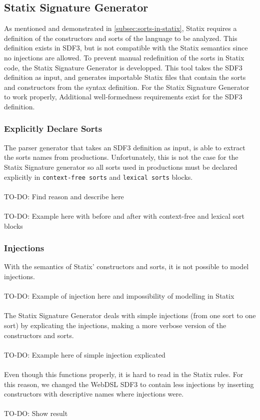     \subsection{\label{subsec:statix-signature-generator}Statix Signature Generator}

      As mentioned and demonstrated in \cref{subsec:sorts-in-statix}, Statix requires a definition of the constructors and sorts of the language to be analyzed. This definition exists in SDF3, but is not compatible with the Statix semantics since no injections are allowed. To prevent manual redefinition of the sorts in Statix code, the Statix Signature Generator is developped. This tool takes the SDF3 definition as input, and generates importable Statix files that contain the sorts and constructors from the syntax definition. For the Statix Signature Generator to work properly, Additional well-formedness requirements exist for the SDF3 definition.

      \subsubsection{Explicitly Declare Sorts}

        The parser generator that takes an SDF3 definition as input, is able to extract the sorts names from productions. Unfortunately, this is not the case for the Statix Signature generator so all sorts used in productions must be declared explicitly in \texttt{context-free sorts} and \texttt{lexical sorts} blocks.
        \\\\TO-DO: Find reason and describe here
        \\\\TO-DO: Example here with before and after with context-free and lexical sort blocks

      \subsubsection{Injections}

        With the semantics of Statix' constructors and sorts, it is not possible to model injections.
        \\\\TO-DO: Example of injection here and impossibility of modelling in Statix
        \\\\The Statix Signature Generator deals with simple injections (from one sort to one sort) by explicating the injections, making a more verbose version of the constructors and sorts.
        \\\\TO-DO: Example here of simple injection explicated
        \\\\Even though this functions properly, it is hard to read in the Statix rules. For this reason, we changed the WebDSL SDF3 to contain less injections by inserting constructors with descriptive names where injections were.
        \\\\TO-DO: Show result

